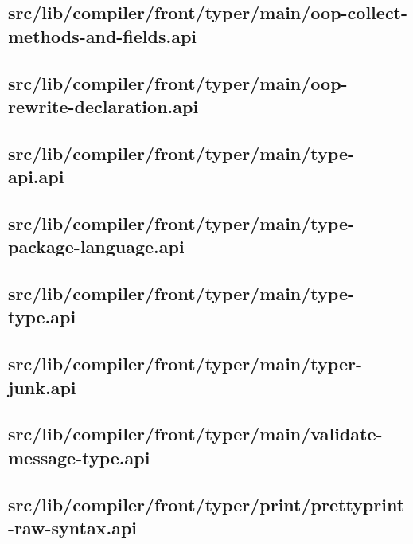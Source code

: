 \subsection{src/lib/compiler/front/typer/main/oop-collect-methods-and-fields.api}


\subsection{src/lib/compiler/front/typer/main/oop-rewrite-declaration.api}


\subsection{src/lib/compiler/front/typer/main/type-api.api}


\subsection{src/lib/compiler/front/typer/main/type-package-language.api}


\subsection{src/lib/compiler/front/typer/main/type-type.api}


\subsection{src/lib/compiler/front/typer/main/typer-junk.api}


\subsection{src/lib/compiler/front/typer/main/validate-message-type.api}


\subsection{src/lib/compiler/front/typer/print/prettyprint-raw-syntax.api}


